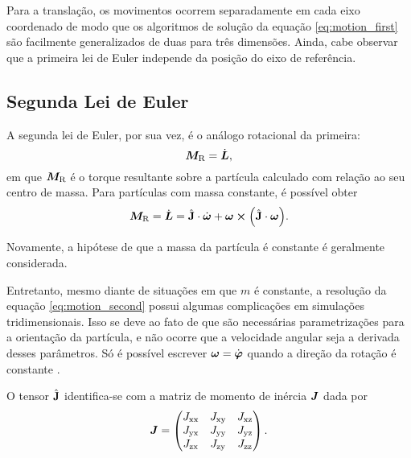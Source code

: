 Para a translação, os movimentos ocorrem separadamente em cada eixo coordenado de modo que os algoritmos de solução da equação \eqref{eq:motion_first} são facilmente generalizados de duas para três dimensões. Ainda, cabe observar que a primeira lei de Euler independe da posição do eixo de referência.

\subsection{Segunda Lei de Euler}

A segunda lei de Euler, por sua vez, é o análogo rotacional da primeira:
\begin{equation*} %
	\resultingTorque = \deriv{1}{\angularMomentum},
\end{equation*}
em que \(\bm{M}_{\text{R}}\) é o torque resultante sobre a partícula calculado com relação ao seu centro de massa. Para partículas com massa constante, é possível obter
\begin{equation} \label{eq:motion_second}
	\resultingTorque = \deriv{1}{\angularMomentum} = \tensorOfInertia\cdot\deriv{1}{\angularVelocity} + \angularVelocity\cross\pqty{\tensorOfInertia\cdot\angularVelocity}.
\end{equation}

Novamente, a hipótese de que a massa da partícula é constante é geralmente considerada. 

Entretanto, mesmo diante de situações em que \(m\) é constante, a resolução da equação \eqref{eq:motion_second} possui algumas complicações em simulações tridimensionais. Isso se deve ao fato de que são necessárias parametrizações para a orientação da partícula, e não ocorre que a velocidade angular seja a derivada desses parâmetros. Só é possível escrever \(\angularVelocity = \deriv{1}{\orientation}\) quando a direção da rotação é constante \cite[p. 32]{bib:dynamics_of_multibody_systems}.

O tensor \(\hat{\mathbf{J}}\) identifica-se com a matriz de momento de inércia \(\bm{J}\) dada por
\begin{equation*}
	\bm{J} =
	\begin{pmatrix}
		J_{\text{xx}} & J_{\text{xy}} & J_{\text{xz}} \\
		J_{\text{yx}} & J_{\text{yy}} & J_{\text{yz}} \\
		J_{\text{zx}} & J_{\text{zy}} & J_{\text{zz}}
	\end{pmatrix}.
\end{equation*}

